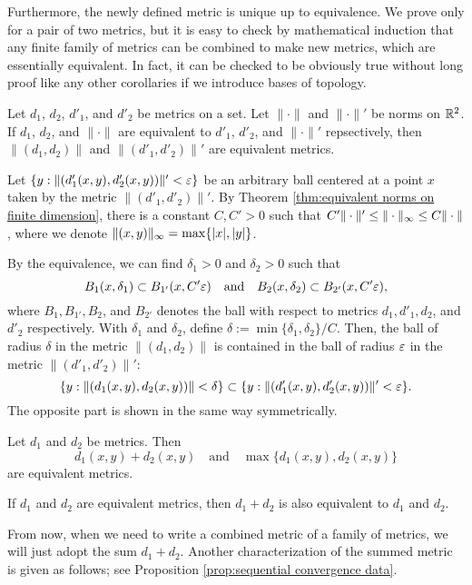 Furthermore, the newly defined metric is unique up to equivalence.
We prove only for a pair of two metrics, but it is easy to check by mathematical induction that any finite family of metrics can be combined to make new metrics, which are essentially equivalent.
In fact, it can be checked to be obviously true without long proof like any other corollaries if we introduce bases of topology.

\begin{prop}
Let $d_1$, $d_2$, $d'_1$, and $d'_2$ be metrics on a set.
Let $\|\cdot\|$ and $\|\cdot\|'$ be norms on $\mathbb{R}^2$.
If $d_1$, $d_2$, and $\|\cdot\|$ are equivalent to $d'_1$, $d'_2$, and $\|\cdot\|'$ repsectively, then $\|(d_1,d_2)\|$ and $\|(d'_1,d'_2)\|'$ are equivalent metrics.
\end{prop}
\begin{pf}
Let $\{y:\|(d'_1(x,y),d'_2(x,y))\|'<\varepsilon\}$ be an arbitrary ball centered at a point $x$ taken by the metric $\|(d'_1,d'_2)\|'$.
By Theorem \ref{thm:equivalent norms on finite dimension}, there is a constant $C,C'>0$ such that $C'\|\cdot\|'\le\|\cdot\|_\infty\le C\|\cdot\|$, where we denote $\|(x,y)\|_\infty=\max\{|x|,|y|\}$.

By the equivalence, we can find $\delta_1>0$ and $\delta_2>0$ such that
\[B_1(x,\delta_1)\subset B_{1'}(x,C'\varepsilon)\quad\text{and}\quad B_2(x,\delta_2)\subset B_{2'}(x,C'\varepsilon),\]
where $B_1,B_{1'},B_2$, and $B_{2'}$ denotes the ball with respect to metrics $d_1,d'_1,d_2$, and $d'_2$ respectively.
With $\delta_1$ and $\delta_2$, define $\delta:=\min\{\delta_1,\delta_2\}/C$.
Then, the ball of radius $\delta$ in the metric $\|(d_1,d_2)\|$ is contained in the ball of radius $\varepsilon$ in the metric $\|(d'_1,d'_2)\|'$:
\[\{y:\|(d_1(x,y),d_2(x,y))\|<\delta\}\subset\{y:\|(d'_1(x,y),d'_2(x,y))\|'<\varepsilon\}.\]
The opposite part is shown in the same way symmetrically.
\end{pf}

\begin{ex}
Let $d_1$ and $d_2$ be metrics.
Then
\[d_1(x,y)+d_2(x,y)\quad\text{and}\quad\max\{d_1(x,y),d_2(x,y)\}\]
are equivalent metrics.
\end{ex}
\begin{ex}
If $d_1$ and $d_2$ are equivalent metrics, then $d_1+d_2$ is also equivalent to $d_1$ and $d_2$.
\end{ex}

From now, when we need to write a combined metric of a family of metrics, we will just adopt the sum $d_1+d_2$.
Another characterization of the summed metric is given as follows; see Proposition \ref{prop:sequential convergence data}.

